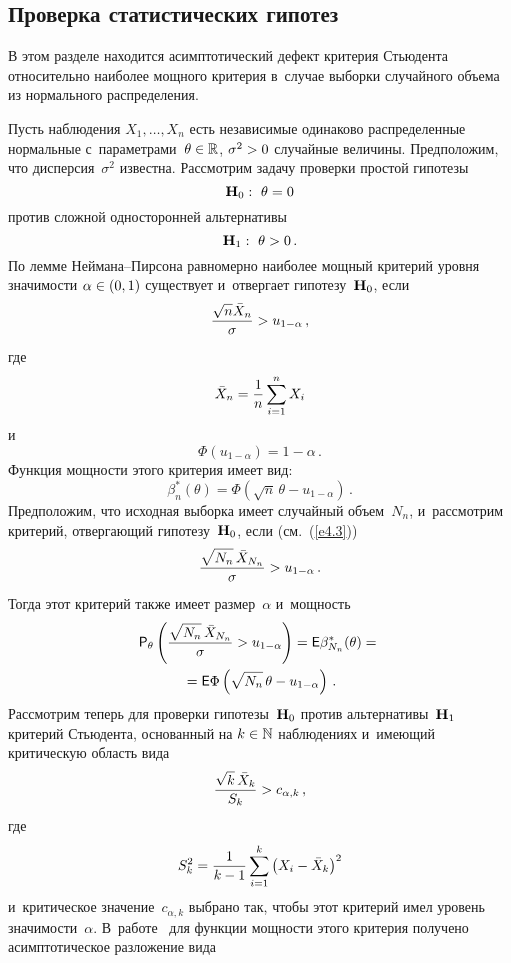 \begin{multicols}{2}
\section{Проверка статистических гипотез}

В этом разделе находится асимптотический дефект критерия Стьюдента 
относительно наиболее мощного критерия в~случае выборки случайного объема 
из нормального распределения.

Пусть наблюдения $X_1,\ldots,X_n$ есть независимые одинаково распределенные 
нормальные с~па\-ра\-мет\-ра\-ми~$\theta\hm \in \mathbb{R}$, $\sigma^2\hm > 0$ случайные 
величины. Предположим, что дисперсия~$\sigma^2$ известна.
Рассмотрим задачу проверки простой гипотезы
\begin{equation*}
{\bf H}_0:\ \theta = 0
\end{equation*}
против сложной односторонней альтернативы
\begin{equation*}
{\bf H}_1:\ \theta > 0\,.
\end{equation*}
По лемме Неймана--Пир\-со\-на равномерно наиболее мощный критерий уровня 
значимости $\alpha\hm \in (0,1)$ существует и~отвергает гипотезу~${\bf H}_0$, если
\begin{equation}
\displaystyle\frac{\displaystyle \sqrt n \bar X_n\mathstrut}{\displaystyle \sigma\mathstrut} > u_{1-\alpha}\,,\label{e4.3}
\end{equation}
где
$$
\bar X_n = \displaystyle\frac{\displaystyle 1\mathstrut}{\displaystyle n\mathstrut} \sum\limits_{i=1}^n X_i
$$
и
$$
\Phi\left(u_{1-\alpha}\right) = 1 - \alpha\,.
$$
Функция мощности этого критерия имеет вид:
\begin{equation*}
\beta^*_n(\theta) = \Phi\left(\sqrt {n}\,  \theta - u_{1-\alpha}\right)\,.
\end{equation*}
Предположим, что исходная выборка имеет случайный объем~$N_n$, и~рассмотрим критерий, 
отвергающий гипотезу~${\bf H}_0$, если (см.~(\ref{e4.3}))
\begin{equation}
\displaystyle\frac{\displaystyle \sqrt {N_n}\, \bar X_{N_n}\mathstrut}{\displaystyle \sigma\mathstrut} > u_{1-\alpha}\,.\label{e4.5}
\end{equation}
Тогда этот критерий также имеет размер~$\alpha$ и~мощность
\begin{multline*}
{\sf P}_\theta \left(\displaystyle\frac{\displaystyle \sqrt {N_n}\, \bar X_{N_n}\mathstrut}{\displaystyle \sigma\mathstrut} > 
u_{1-\alpha}\right) = {\sf E} \beta^*_{N_n}(\theta) ={}
\\
{}= {\sf E} \Phi\left(\sqrt {N_n}\, \theta - u_{1-\alpha}\right)\,.
\end{multline*}
Рассмотрим теперь для проверки гипотезы~${\bf H}_0$ против 
альтернативы~${\bf H}_1$ критерий Стьюдента, основанный на $k\hm \in \mathbb{N}$ 
наблюдениях и~имеющий критическую область вида
\begin{equation}
\displaystyle\frac{\displaystyle \sqrt {k}\,\bar X_k\mathstrut}{\displaystyle S_k\mathstrut} > c_{\alpha,k}\,,
\label{e4.7}
\end{equation}
где
$$
S_k^2 = \displaystyle\frac{\displaystyle 1\mathstrut}{\displaystyle k-1\mathstrut} \sum\limits_{i=1}^k \left(X_i - \bar X_k\right)^2
$$
и~критическое значение~$c_{\alpha,k}$ выбрано так, чтобы этот критерий 
имел уровень значимости~$\alpha$.
В~работе~\cite[формула~(5.6)]{1-ben} для функции мощности этого критерия получено 
асимптотическое разложение вида


\end{multicols}
